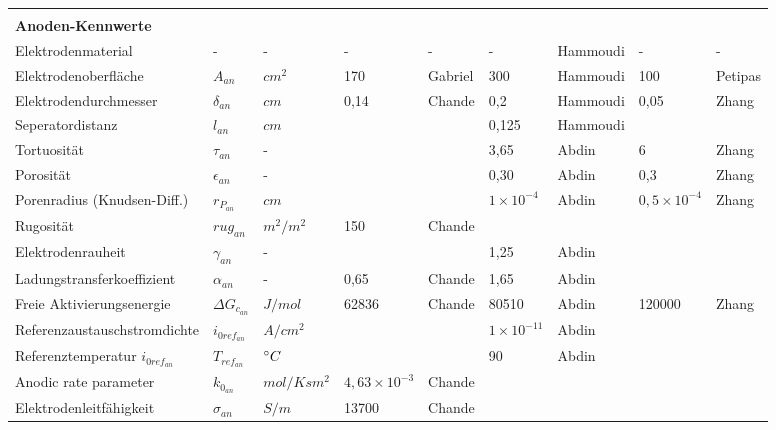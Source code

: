 \documentclass[onecolumn,10pt,titlepage]{article}
\begin{document}
\begin{table}[]
\begin{tabular*}{\textwidth}{lllllllll}
		&&&&&&&& \\
		\textbf{Anoden-Kennwerte}&&&&&&&& \\
		Elektrodenmaterial 						& - 					& -					& - 		& -	 		& - 					& Hammoudi	& - 					& -			\\
		Elektrodenoberfläche 					& $A_{an}$				& $cm^{2}$			& 170 		& Gabriel	& 300					& Hammoudi 	& 100 					& Petipas 	\\
		Elektrodendurchmesser 					& $\delta_{an}$			& $cm$ 				& 0,14 		& Chande 	& 0,2 					& Hammoudi	& 0,05 					& Zhang 	\\
		Seperatordistanz 						& $l_{an}$ 				& $cm$ 				& 	 		& 	 		& 0,125 				& Hammoudi	& 	 					& 			\\

		Tortuosität 							& $\tau_{an}$			& - 				& 	 		& 	 		& 3,65 					& Abdin		& 6 					& Zhang 	\\
		Porosität 								& $\epsilon_{an}$		& - 				& 	 		& 	 		& 0,30 					& Abdin		& 0,3 					& Zhang 	\\
		Porenradius (Knudsen-Diff.) 			& $r_{P_{an}}$ 			& $cm$ 				& 	 		& 	 		& $1\times{10^{-4}}$	& Abdin		& $0,5\times{10^{-4}}$ 	& Zhang 	\\
		Rugosität 								& $rug_{an}$			& $m^{2}/m^{2}$		& 150 		& Chande	& 	 					& 			& 	 					& 	 		\\
		Elektrodenrauheit 						& $\gamma_{an}$ 		& -	 				& 	 		& 	 		& 1,25 					& Abdin		&  						& 	 		\\

		Ladungstransferkoeffizient 				& $\alpha_{an}$ 		& - 				& 0,65 		& Chande	& 1,65 					& Abdin		& 	 					& 	 		\\
		Freie Aktivierungsenergie 				& ${\Delta}G_{c_{an}}$	& $J/mol$ 			& 62836		& Chande	& 80510 				& Abdin		& 120000 				& Zhang 	\\
		Referenzaustauschstromdichte			& $i_{0ref_{an}}$		& $A/cm^{2}$ 		& 	 		& 	 		& $1\times{10^{-11}}$ 	& Abdin		& 	 					& 	 		\\
		Referenztemperatur $i_{0ref_{an}}$ 		& $T_{ref_{an}}$ 		& $\degree{C}$	 	& 	 		& 	 		& 90 					& Abdin		& 	 					& 	 		\\
		Anodic rate parameter					& $k_{0_{an}}$			& $mol/Ksm^{2}$		& $4,63\times{10^{-3}}$ & Chande 				&& 	 		& 	 					& 	 		\\
		Elektrodenleitfähigkeit					& $\sigma_{an}$ 		& $S/m$				& 13700	 	& Chande 	& 						& 	 		& 	 					& 	 		\\


\end{tabular*}
\end{table}
\end{document}
